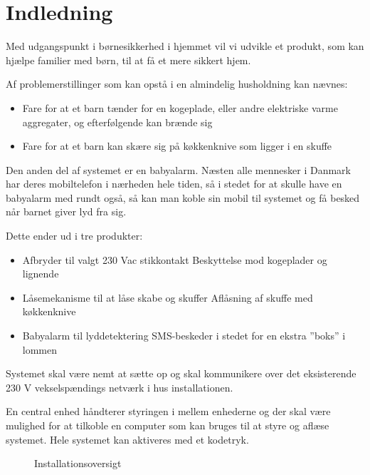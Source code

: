 \chapter{Indledning}

Med udgangspunkt i børnesikkerhed i hjemmet vil vi udvikle et produkt, som kan hjælpe familier med børn, til at få et mere sikkert hjem.

Af problemerstillinger som kan opstå i en almindelig husholdning kan nævnes:
\begin{itemize}
	\item Fare for at et barn tænder for en kogeplade, eller andre elektriske varme aggregater, og efterfølgende kan brænde sig
	\item Fare for at et barn kan skære sig på køkkenknive som ligger i en skuffe
\end{itemize}

Den anden del af systemet er en babyalarm. Næsten alle mennesker i Danmark har deres mobiltelefon i nærheden hele tiden, så i stedet for at skulle have en babyalarm med rundt også, så kan man koble sin mobil til systemet og få besked når barnet giver lyd fra sig.

Dette ender ud i tre produkter:

\begin{itemize}
\item Afbryder til valgt 230 Vac stikkontakt
\subitem Beskyttelse mod kogeplader og lignende
\item Låsemekanisme til at låse skabe og skuffer
\subitem Aflåsning af skuffe med køkkenknive
\item Babyalarm til lyddetektering
\subitem SMS-beskeder i stedet for en ekstra ''boks'' i lommen
\end{itemize}

Systemet skal være nemt at sætte op og skal kommunikere over det eksisterende 230 V vekselspændings netværk i hus installationen.

En central enhed håndterer styringen i mellem enhederne og der skal være mulighed for at tilkoble en computer som kan bruges til at styre og aflæse systemet. Hele systemet kan aktiveres med et kodetryk.

\newpage

\begin{figure}[h] \centering
{}
\caption{Installationsoversigt}
\label{lab:installationsoversigt}
\end{figure}

